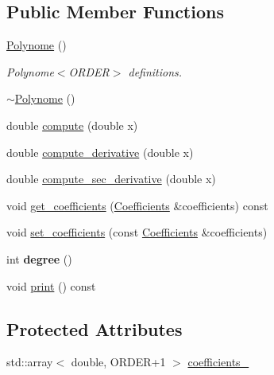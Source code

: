 \subsection*{Public Member Functions}
\begin{DoxyCompactItemize}
\item 
\hyperlink{classblmc__robots_1_1Polynome_a8ece7a7021cc62167c023d51a5bb3879}{Polynome} ()
\begin{DoxyCompactList}\small\item\em Polynome$<$\+O\+R\+D\+E\+R$>$ definitions. \end{DoxyCompactList}\item 
\hyperlink{classblmc__robots_1_1Polynome_a4541e4b629061dfdbca73559a42a6e93}{$\sim$\+Polynome} ()
\item 
double \hyperlink{classblmc__robots_1_1Polynome_ae102191e0f730744e822c8e7599008d6}{compute} (double x)
\item 
double \hyperlink{classblmc__robots_1_1Polynome_a62183ec0d1bc22c224c14a58dd10e3e9}{compute\+\_\+derivative} (double x)
\item 
double \hyperlink{classblmc__robots_1_1Polynome_a6a20495bd6c6105b5109244b29b5d069}{compute\+\_\+sec\+\_\+derivative} (double x)
\item 
void \hyperlink{classblmc__robots_1_1Polynome_a31e2774f54d5a8a242878d6157e412c9}{get\+\_\+coefficients} (\hyperlink{classblmc__robots_1_1Polynome_a31e086184f3934b269e8318cce2859eb}{Coefficients} \&coefficients) const 
\item 
void \hyperlink{classblmc__robots_1_1Polynome_ad8daa2f5ffa1891aac2663519950afae}{set\+\_\+coefficients} (const \hyperlink{classblmc__robots_1_1Polynome_a31e086184f3934b269e8318cce2859eb}{Coefficients} \&coefficients)
\item 
int {\bfseries degree} ()\hypertarget{classblmc__robots_1_1Polynome_ada7f56fa60b0d23dd0ab9fedbbc1e0db}{}\label{classblmc__robots_1_1Polynome_ada7f56fa60b0d23dd0ab9fedbbc1e0db}

\item 
void \hyperlink{classblmc__robots_1_1Polynome_a1bf6f3cb3fa919dbdff30e55fd200324}{print} () const 
\end{DoxyCompactItemize}
\subsection*{Protected Attributes}
\begin{DoxyCompactItemize}
\item 
std\+::array$<$ double, O\+R\+D\+ER+1 $>$ \hyperlink{classblmc__robots_1_1Polynome_a0aa7d57743e14ed7f29f9b09509ce2e6}{coefficients\+\_\+}
\end{DoxyCompactItemize}
